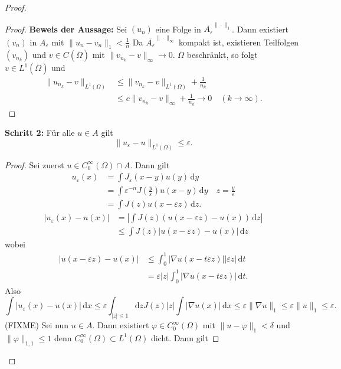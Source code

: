 \documentclass[
paper=a4,
bibtotocnumbered,
liststotocnumbered,
tablecaptionabove,
pointlessnumbers,
twoside,
openright,
10pt
]
{report}
\let\phi\varphi
\theoremstyle{definition}
\numberwithin{equation}{chapter}
\begin{document}
\begin{proof}
\begin{proof}
\textbf{Beweis der Aussage:} Sei $(u_n)$ eine Folge in $\overline{A_\varepsilon}^{\|\cdot \|_1}$. Dann existiert $(v_n)$ in $A_\varepsilon$ mit $\| u_n - v_n\|_1 < \frac{1}{n}$ Da $\overline{A_\varepsilon}^{\|\cdot \|_\infty}$ kompakt ist, existieren Teilfolgen $(v_{n_k})$ und $v\in C(\overline{\Omega})$ mit $\| v_{n_k} -v\|_\infty \to 0$. $\overline \Omega$ beschränkt, so folgt $v\in L^1(\overline{\Omega})$ und
\begin{align*}
 \|u_{n_k}-v\|_{L^1(\Omega)} &\le \| v_{n_k}-v\|_{L^1(\Omega)} + \frac{1}{n_k}\\
 &\le c\| v_{n_k}-v\|_\infty + \frac{1}{n_k} \to 0 \quad (k\to \infty).
\end{align*}
\end{proof}
\textbf{Schritt 2:} Für alle $u\in A$ gilt
\begin{equation}
 \|u_\varepsilon -u\|_{L^1(\Omega)} \le \varepsilon.
\end{equation}
\begin{proof}
Sei zuerst $u\in C_0^\infty(\Omega) \cap A$. Dann gilt
\begin{align*}
 u_\varepsilon(x) &= \int J_\varepsilon(x-y) u(y) \, \mathrm dy \\
 &= \int \varepsilon^{-n} J(\frac{y}{\varepsilon}) u(x-y)\, \mathrm dy \quad z=\frac{y}{\varepsilon}\\
 &= \int J(z) u(x-\varepsilon z) \, \mathrm dz.
\end{align*}
\begin{align*}
 |u_\varepsilon(x) -u(x)| &= | \int J(z) ( u(x-\varepsilon z) - u(x)) \, \mathrm dz| \\
 &\le \int J(z) |u(x- \varepsilon z) - u(x)|\, \mathrm dz
\end{align*}
wobei
\begin{align*}
 |u(x-\varepsilon z) - u(x) | &\le \int_0^1 |\nabla u(x-t\varepsilon z) | |\varepsilon z|\, \mathrm dt\\
 &= \varepsilon |z| \int_0^1 |\nabla u(x-t\varepsilon z) |\, \mathrm dt.
\end{align*}
Also
\begin{equation}
 \int | u_\varepsilon(x) - u(x)|\, \mathrm dx\le \varepsilon \int_{|z|\le 1} \mathrm dz J(z) |z| \int |\nabla u(x)|\, \mathrm dx \le \varepsilon \| \nabla u\|_1\le \varepsilon \| u\|_1\le \varepsilon.
\end{equation}
(FIXME)
Sei nun $u\in A$. Dann existiert $\phi \in C_0^\infty(\Omega)$ mit $\|u-\phi\|_1 <\delta$ und $\| \phi\|_{1,1} \le 1$ denn $C_0^\infty(\Omega) \subset L^1(\Omega)$ dicht. Dann gilt

\end{proof}
\end{proof}
\end{document}
